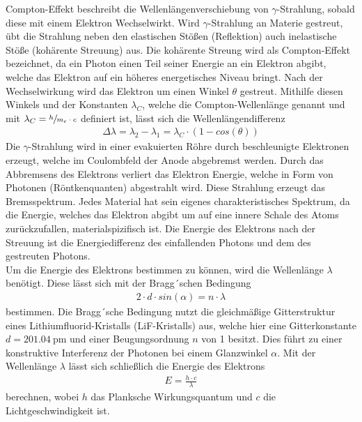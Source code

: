     \justifying Compton-Effekt beschreibt die Wellenlängenverschiebung von $\gamma$-Strahlung, sobald diese mit einem Elektron Wechselwirkt. 
    Wird $\gamma$-Strahlung an Materie gestreut, übt die Strahlung neben den elastischen Stößen (Reflektion) auch inelastische Stöße (kohärente Streuung) aus. 
    Die kohärente Streung wird als Compton-Effekt bezeichnet, da ein Photon einen Teil seiner Energie an ein Elektron abgibt, welche das Elektron auf ein 
    höheres energetisches Niveau bringt. Nach der Wechselwirkung wird das Elektron um einen Winkel $\theta$ gestreut. Mithilfe diesen Winkels und der Konstanten
    $\lambda_C$, welche die Compton-Wellenlänge genannt und mit $\lambda_C = \sfrac{h}{m_e \cdot c}$ definiert ist, lässt sich die Wellenlängendifferenz
    \begin{align}
        \Delta \lambda = \lambda_2 - \lambda_1 = \lambda_C \cdot (1-cos(\theta)) \label{eq:1}
    \end{align}
    \justifying Die $\gamma$-Strahlung wird in einer evakuierten Röhre durch beschleunigte Elektronen erzeugt, welche im Coulombfeld der Anode
    abgebremst werden. Durch das Abbremsens des Elektrons verliert das Elektron Energie, welche in Form von Photonen (Röntkenquanten) abgestrahlt wird. Diese Strahlung
    erzeugt das Bremsspektrum. Jedes Material hat sein eigenes charakteristisches Spektrum, da die Energie, welches das Elektron abgibt um auf eine innere Schale des 
    Atoms zurückzufallen, materialspizifisch ist. Die Energie des Elektrons nach der Streuung ist die Energiedifferenz des einfallenden Photons und dem des gestreuten 
    Photons.\\
    Um die Energie des Elektrons bestimmen zu können, wird die Wellenlänge $\lambda$ benötigt. Diese lässt sich mit der Bragg´schen Bedingung \cite{V603}
    \begin{align}
        2 \cdot d \cdot sin(\alpha) = n \cdot \lambda \label{eq:2}
    \end{align}
    bestimmen. Die Bragg´sche Bedingung nutzt die gleichmäßige Gitterstruktur eines Lithiumfluorid-Kristalls (LiF-Kristalls) aus, welche hier eine Gitterkonstante $d = \SI{201.04}
    {\pico\meter}$ und einer Beugungsordnung $n$ von 1 besitzt. Dies führt zu einer konstruktive Interferenz der Photonen bei einem Glanzwinkel $\alpha$. Mit der Wellenlänge
    $\lambda$ lässt sich schließlich die Energie des Elektrons
    \begin{align}
        E = \frac{h \cdot c}{\lambda} \label{eq:3}
    \end{align}
    berechnen, wobei $h$ das Planksche Wirkungsquantum und $c$ die Lichtgeschwindigkeit ist. 



